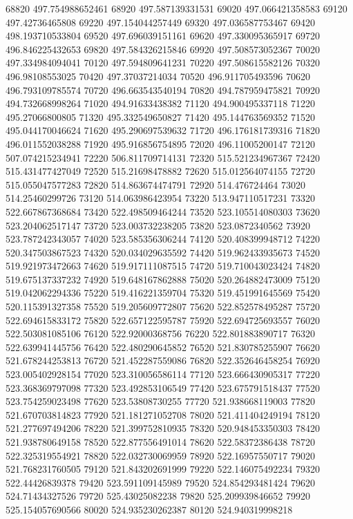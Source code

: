 {68820 497.754988652461
68920 497.587139331531
69020 497.066421358583
69120 497.42736465808
69220 497.154044257449
69320 497.036587753467
69420 498.193710533804
69520 497.696039151161
69620 497.330095365917
69720 496.846225432653
69820 497.584326215846
69920 497.508573052367
70020 497.334984094041
70120 497.594809641231
70220 497.508615582126
70320 496.98108553025
70420 497.37037214034
70520 496.911705493596
70620 496.793109785574
70720 496.663543540194
70820 494.787959475821
70920 494.732668998264
71020 494.91633438382
71120 494.900495337118
71220 495.27066800805
71320 495.332549650827
71420 495.144763569352
71520 495.044170046624
71620 495.290697539632
71720 496.176181739316
71820 496.011552038288
71920 495.916856754895
72020 496.11005200147
72120 507.074215234941
72220 506.811709714131
72320 515.521234967367
72420 515.431477427049
72520 515.21698478882
72620 515.012564074155
72720 515.055047577283
72820 514.863674474791
72920 514.476724464
73020 514.25460299726
73120 514.063986423954
73220 513.947110517231
73320 522.667867368684
73420 522.498509464244
73520 523.105514080303
73620 523.204062517147
73720 523.003732238205
73820 523.0872340562
73920 523.787242343057
74020 523.585356306244
74120 520.408399948712
74220 520.347503867523
74320 520.034029635592
74420 519.962433935673
74520 519.921973472663
74620 519.917111087515
74720 519.710043023424
74820 519.675137337232
74920 519.648167862888
75020 520.264882473009
75120 519.042062294336
75220 519.416221359704
75320 519.451991645569
75420 520.115391327358
75520 519.205609772807
75620 522.852578495287
75720 522.694615833172
75820 522.657122595787
75920 522.694725693557
76020 522.503081085106
76120 522.92000368756
76220 522.801883890717
76320 522.639941445756
76420 522.480290645852
76520 521.830785255907
76620 521.678244253813
76720 521.452287559086
76820 522.352646458254
76920 523.005402928154
77020 523.310056586114
77120 523.666430905317
77220 523.368369797098
77320 523.492853106549
77420 523.675791518437
77520 523.754259023498
77620 523.53808730255
77720 521.938668119003
77820 521.670703814823
77920 521.181271052708
78020 521.411404249194
78120 521.277697494206
78220 521.399752810935
78320 520.948453350303
78420 521.938780649158
78520 522.877556491014
78620 522.58372386438
78720 522.325319554921
78820 522.032730069959
78920 522.16957550717
79020 521.768231760505
79120 521.843202691999
79220 522.146075492234
79320 522.44426839378
79420 523.591109145989
79520 524.854293481424
79620 524.71434327526
79720 525.43025082238
79820 525.209939846652
79920 525.154057690566
80020 524.935230262387
80120 524.940319998218
}
